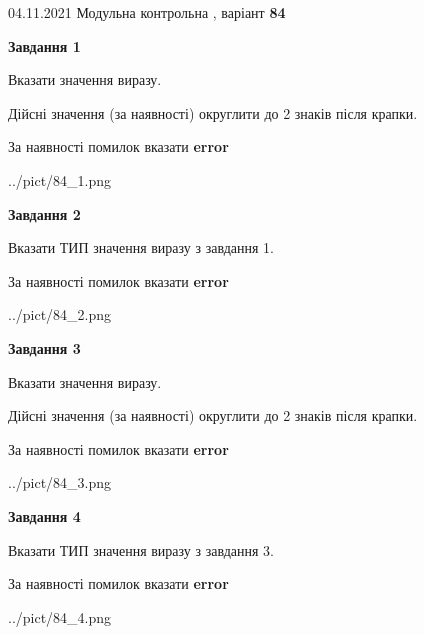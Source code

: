 \documentclass[11pt, ukrainian]{article}
\begin{document}
{04.11.2021 Модульна контрольна , варіант  \No \textbf { 84 }\par}
{
\begin {large}
{\begin {center}\textbf{Завдання 1}\end {center}}\par
Вказати значення виразу. \par
Дійсні значення (за наявності) округлити до 2 знаків після крапки. \par
За наявності помилок вказати \textbf{error}

\begin{center}
	{../pict/84_1.png}
\end{center}
\newpage

{\begin {center}\textbf{Завдання 2}\end {center}}\par
Вказати ТИП значення виразу з завдання 1. \par
За наявності помилок вказати \textbf{error}

\begin{center}
	{../pict/84_2.png}
\end{center}
\newpage

{\begin {center}\textbf{Завдання 3}\end {center}}\par
Вказати значення виразу. \par
Дійсні значення (за наявності) округлити до 2 знаків після крапки. \par
За наявності помилок вказати \textbf{error}

\begin{center}
	{../pict/84_3.png}
\end{center}
\newpage

{\begin {center}\textbf{Завдання 4}\end {center}}\par
Вказати ТИП значення виразу з завдання 3. \par
За наявності помилок вказати \textbf{error}

\begin{center}
	{../pict/84_4.png}
\end{center}
\newpage


\end{large}}
\end{document}
